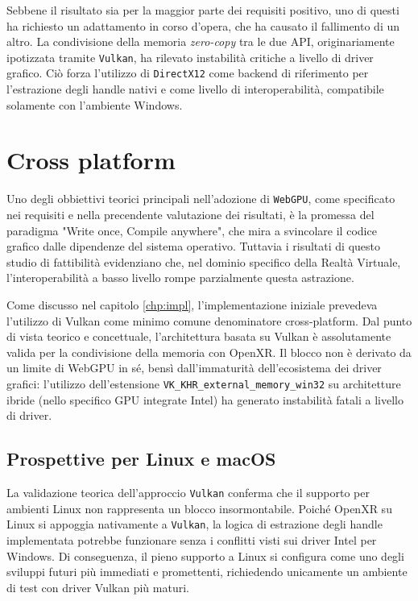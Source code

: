 \documentclass[a4paper, 11pt, twoside]{report}
\begin{document}
Sebbene il risultato sia per la maggior parte dei requisiti positivo, uno di questi ha richiesto un adattamento in corso
d'opera, che ha causato il fallimento di un altro. La condivisione della memoria \textit{zero-copy} tra le due API,
originariamente ipotizzata tramite \texttt{\gls{Vulkan}}, ha rilevato instabilità critiche a livello di driver grafico.
Ciò forza l'utilizzo di \texttt{\gls{DirectX}12} come backend di riferimento per l'estrazione degli handle nativi e come
livello di interoperabilità, compatibile solamente con l'ambiente Windows.

\section{Cross platform}

Uno degli obbiettivi teorici principali nell'adozione di \texttt{WebGPU}, come specificato nei requisiti e nella
precendente valutazione dei risultati, è la promessa del paradigma "Write once, Compile anywhere", che mira a svincolare
il codice grafico dalle dipendenze del sistema operativo. Tuttavia i risultati di questo studio di fattibilità
evidenziano che, nel dominio specifico della Realtà Virtuale, l'interoperabilità a basso livello rompe parzialmente
questa astrazione.

Come discusso nel capitolo \ref{chp:impl}, l'implementazione iniziale prevedeva l'utilizzo di Vulkan come minimo comune
denominatore cross-platform.
Dal punto di vista teorico e concettuale, l'architettura basata su Vulkan è assolutamente valida per la condivisione
della memoria con OpenXR.
Il blocco non è derivato da un limite di WebGPU in sé, bensì dall'immaturità dell'ecosistema dei driver grafici:
l'utilizzo dell'estensione \texttt{VK\_KHR\_external\_memory\_win32} su architetture ibride (nello specifico GPU
integrate Intel) ha generato instabilità fatali a livello di driver.

\subsection{Prospettive per Linux e macOS}

La validazione teorica dell'approccio \texttt{\gls{Vulkan}} conferma che il supporto per ambienti Linux non rappresenta
un blocco insormontabile. Poiché OpenXR su Linux si appoggia nativamente a \texttt{\gls{Vulkan}}, la logica di
estrazione degli handle implementata potrebbe funzionare senza i conflitti visti sui driver Intel per Windows.
Di conseguenza, il pieno supporto a Linux si configura come uno degli sviluppi futuri più immediati e promettenti,
richiedendo unicamente un ambiente di test con driver Vulkan più maturi.
\end{document}
